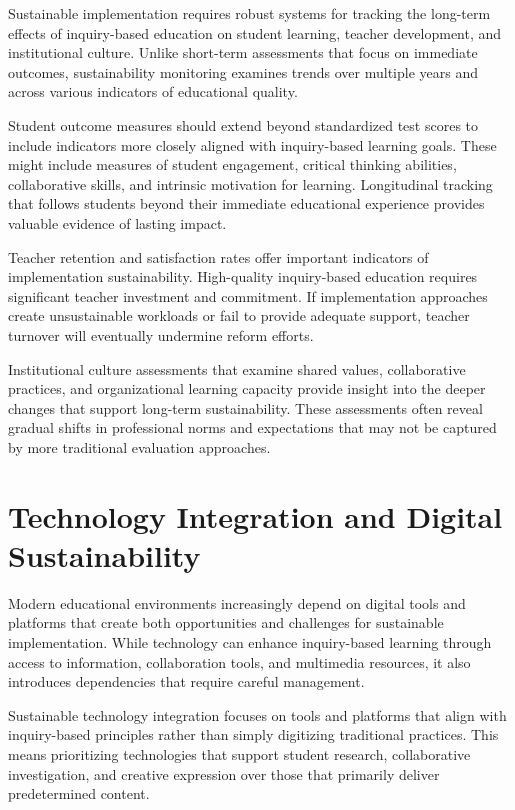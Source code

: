 \documentclass[
  Letterpaper,
]{scrbook}
\begin{document}
Sustainable implementation requires robust systems for tracking the
long-term effects of inquiry-based education on student learning,
teacher development, and institutional culture. Unlike short-term
assessments that focus on immediate outcomes, sustainability monitoring
examines trends over multiple years and across various indicators of
educational quality.

Student outcome measures should extend beyond standardized test scores
to include indicators more closely aligned with inquiry-based learning
goals. These might include measures of student engagement, critical
thinking abilities, collaborative skills, and intrinsic motivation for
learning. Longitudinal tracking that follows students beyond their
immediate educational experience provides valuable evidence of lasting
impact.

Teacher retention and satisfaction rates offer important indicators of
implementation sustainability. High-quality inquiry-based education
requires significant teacher investment and commitment. If
implementation approaches create unsustainable workloads or fail to
provide adequate support, teacher turnover will eventually undermine
reform efforts.

Institutional culture assessments that examine shared values,
collaborative practices, and organizational learning capacity provide
insight into the deeper changes that support long-term sustainability.
These assessments often reveal gradual shifts in professional norms and
expectations that may not be captured by more traditional evaluation
approaches.

\section{Technology Integration and Digital
Sustainability}\label{technology-integration-and-digital-sustainability}

Modern educational environments increasingly depend on digital tools and
platforms that create both opportunities and challenges for sustainable
implementation. While technology can enhance inquiry-based learning
through access to information, collaboration tools, and multimedia
resources, it also introduces dependencies that require careful
management.

Sustainable technology integration focuses on tools and platforms that
align with inquiry-based principles rather than simply digitizing
traditional practices. This means prioritizing technologies that support
student research, collaborative investigation, and creative expression
over those that primarily deliver predetermined content.
\end{document}
